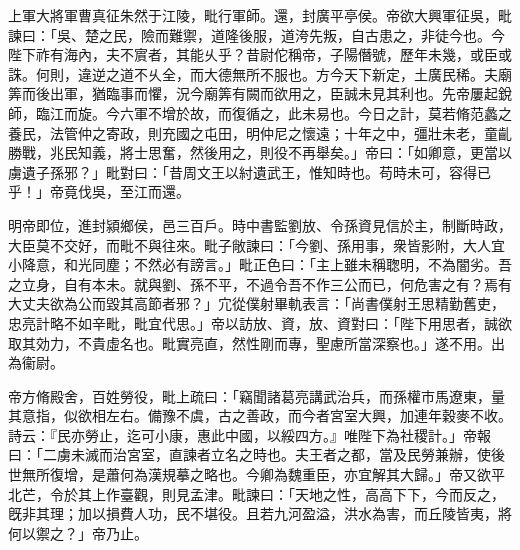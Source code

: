 \begin{pinyinscope}
 
 
 
 上軍大將軍曹真征朱然于江陵，毗行軍師。還，封廣平亭侯。帝欲大興軍征吳，毗諫曰：「吳、楚之民，險而難禦，道隆後服，道洿先叛，自古患之，非徒今也。今陛下祚有海內，夫不賔者，其能乆乎？昔尉佗稱帝，子陽僭號，歷年未幾，或臣或誅。何則，違逆之道不乆全，而大德無所不服也。方今天下新定，土廣民稀。夫廟筭而後出軍，猶臨事而懼，況今廟筭有闕而欲用之，臣誠未見其利也。先帝屢起銳師，臨江而旋。今六軍不增於故，而復循之，此未易也。今日之計，莫若脩范蠡之養民，法管仲之寄政，則充國之屯田，明仲尼之懷遠；十年之中，彊壯未老，童齓勝戰，兆民知義，將士思奮，然後用之，則役不再舉矣。」帝曰：「如卿意，更當以虜遺子孫邪？」毗對曰：「昔周文王以紂遺武王，惟知時也。苟時未可，容得已乎！」帝竟伐吳，至江而還。
 
 
 
 
 明帝即位，進封潁鄉侯，邑三百戶。時中書監劉放、令孫資見信於主，制斷時政，大臣莫不交好，而毗不與往來。毗子敞諫曰：「今劉、孫用事，衆皆影附，大人宜小降意，和光同塵；不然必有謗言。」毗正色曰：「主上雖未稱聦明，不為闇劣。吾之立身，自有本未。就與劉、孫不平，不過令吾不作三公而已，何危害之有？焉有大丈夫欲為公而毀其高節者邪？」宂從僕射畢軌表言：「尚書僕射王思精勤舊吏，忠亮計略不如辛毗，毗宜代思。」帝以訪放、資，放、資對曰：「陛下用思者，誠欲取其効力，不貴虛名也。毗實亮直，然性剛而專，聖慮所當深察也。」遂不用。出為衞尉。
 
 
帝方脩殿舍，百姓勞役，毗上疏曰：「竊聞諸葛亮講武治兵，而孫權巿馬遼東，量其意指，似欲相左右。備豫不虞，古之善政，而今者宮室大興，加連年穀麥不收。詩云：『民亦勞止，迄可小康，惠此中國，以綏四方。』唯陛下為社稷計。」帝報曰：「二虜未滅而治宮室，直諫者立名之時也。夫王者之都，當及民勞兼辦，使後世無所復增，是蕭何為漢規摹之略也。今卿為魏重臣，亦宜解其大歸。」帝又欲平北芒，令於其上作臺觀，則見孟津。毗諫曰：「天地之性，高高下下，今而反之，旣非其理；加以損費人功，民不堪役。且若九河盈溢，洪水為害，而丘陵皆夷，將何以禦之？」帝乃止。
 

\end{pinyinscope}
